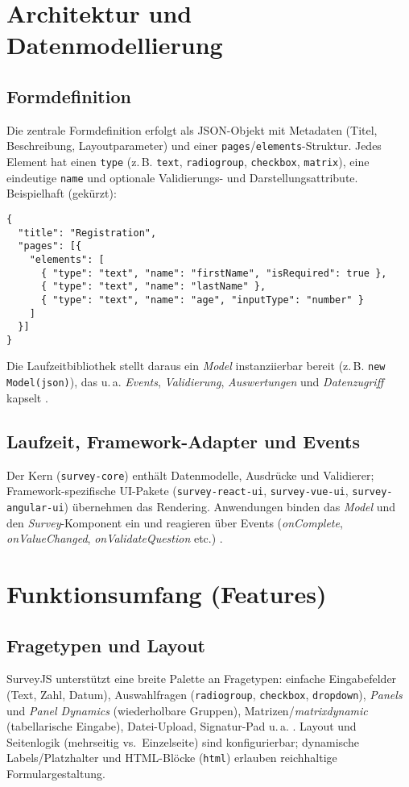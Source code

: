 \documentclass[11pt,a4paper]{article}
\begin{document}
\section{Architektur und Datenmodellierung}
\subsection*{Formdefinition}
Die zentrale Formdefinition erfolgt als JSON-Objekt mit Metadaten (Titel, Beschreibung, Layoutparameter) und einer \texttt{pages}/\texttt{elements}-Struktur. Jedes Element hat einen \texttt{type} (z.\,B. \texttt{text}, \texttt{radiogroup}, \texttt{checkbox}, \texttt{matrix}), eine eindeutige \texttt{name} und optionale Validierungs- und Darstellungsattribute. Beispielhaft (gekürzt):

\begin{verbatim}
{
  "title": "Registration",
  "pages": [{
    "elements": [
      { "type": "text", "name": "firstName", "isRequired": true },
      { "type": "text", "name": "lastName" },
      { "type": "text", "name": "age", "inputType": "number" }
    ]
  }]
}
\end{verbatim}

Die Laufzeitbibliothek stellt daraus ein \emph{Model} instanziierbar bereit (z.\,B. \verb|new Model(json)|), das u.\,a. \emph{Events}, \emph{Validierung}, \emph{Auswertungen} und \emph{Datenzugriff} kapselt \cite{surveyjs-docs-core}.

\subsection*{Laufzeit, Framework-Adapter und Events}
Der Kern (\texttt{survey-core}) enthält Datenmodelle, Ausdrücke und Validierer; Framework-spezifische UI-Pakete (\texttt{survey-react-ui}, \texttt{survey-vue-ui}, \texttt{survey-angular-ui}) übernehmen das Rendering. Anwendungen binden das \emph{Model} und den \emph{Survey}-Komponent ein und reagieren über Events (\emph{onComplete}, \emph{onValueChanged}, \emph{onValidateQuestion} etc.) \cite{surveyjs-form-library, surveyjs-docs-core}. 

\section{Funktionsumfang (Features)}
\subsection*{Fragetypen und Layout}
SurveyJS unterstützt eine breite Palette an Fragetypen: einfache Eingabefelder (Text, Zahl, Datum), Auswahlfragen (\texttt{radiogroup}, \texttt{checkbox}, \texttt{dropdown}), \emph{Panels} und \emph{Panel Dynamics} (wiederholbare Gruppen), Matrizen/\emph{matrixdynamic} (tabellarische Eingabe), Datei-Upload, Signatur-Pad u.\,a. \cite{surveyjs-form-library}. Layout und Seitenlogik (mehrseitig vs.\ Einzelseite) sind konfigurierbar; dynamische Labels/Platzhalter und HTML-Blöcke (\texttt{html}) erlauben reichhaltige Formulargestaltung.
\end{document}
